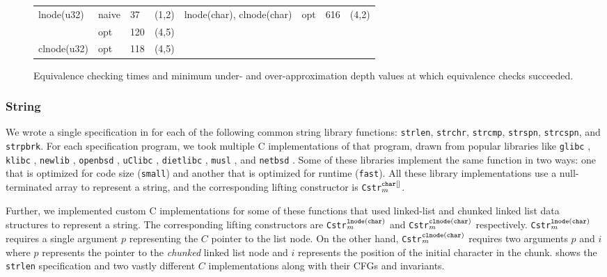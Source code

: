 \begin{figure}[t]
\begin{scriptsize}
\begin{tabular}{lllclllc}
lnode(u32) & naive & 37 & (1,2) &                                              lnode(char), clnode(char) & opt & 616 & (4,2)         \\
           & opt & 120 & (4,5)   &                                               & & & \\
clnode(u32) & opt & 118 & (4,5)   &                                               & & & \\
\bottomrule
\end{tabular}
\end{scriptsize}
\vspace{-5px}
\caption{\label{tab:results}Equivalence checking times and minimum under- and over-approximation depth values at which equivalence checks succeeded.}
\vspace{-5px}
\end{figure}

\subsubsection*{String} We wrote a single specification in \SpecL{} for each of the
following
common string library functions: {\tt strlen}, {\tt strchr}, {\tt strcmp}, {\tt strspn},
{\tt strcspn}, and {\tt strpbrk}.  For each specification
program, we took multiple C implementations of that program, drawn from popular
libraries like {\tt glibc} \cite{glibc}, {\tt klibc} \cite{klibc}, {\tt newlib} \cite{newlib},
{\tt openbsd} \cite{openbsdlibc}, {\tt uClibc} \cite{uclibc},
{\tt dietlibc} \cite{dietlibc}, {\tt musl} \cite{musl}, and {\tt netbsd} \cite{netbsd}.
Some of these libraries implement the same function in two ways: one that is optimized
for code size ({\tt small}) and another that is optimized for runtime ({\tt fast}).
All these library implementations use a null-terminated array to represent
a string, and the
corresponding lifting constructor is {\tt Cstr}$^{\tt char[]}_m$.

Further, we implemented
custom C implementations for some of these functions that used
linked-list
and chunked linked list data structures
to represent a string.
The corresponding lifting constructors are {\tt Cstr}$^{\tt lnode(char)}_m$
and {\tt Cstr}$^{\tt clnode(char)}_m$ respectively.
{\tt Cstr}$^{\tt lnode(char)}_m$ requires a single
argument $p$ representing the $C$ pointer to the list node.
On the other hand, {\tt Cstr}$^{\tt clnode(char)}_m$ requires two arguments $p$
and $i$ where $p$ represents the pointer to the {\em chunked} linked list node
and $i$ represents the position of the initial character in the chunk.
 shows the {\tt strlen} specification and two vastly
different $C$ implementations along with their CFGs and invariants.


